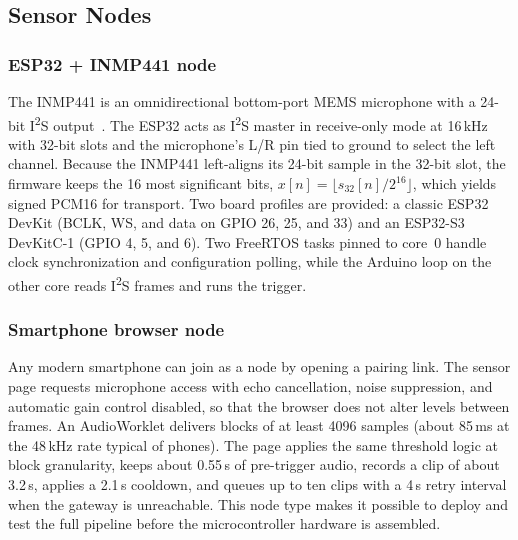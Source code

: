 \documentclass[conference]{IEEEtran}
\newcommand{\ms}{\,ms}
\begin{document}
\subsection{Sensor Nodes}
\subsubsection{ESP32 + INMP441 node}
The INMP441 is an omnidirectional bottom-port MEMS microphone with a 24-bit I\textsuperscript{2}S output~\cite{inmp441}. The ESP32 acts as I\textsuperscript{2}S master in receive-only mode at 16\,kHz with 32-bit slots and the microphone's L/R pin tied to ground to select the left channel. Because the INMP441 left-aligns its 24-bit sample in the 32-bit slot, the firmware keeps the 16 most significant bits, $x[n] = \lfloor s_{32}[n] / 2^{16} \rfloor$, which yields signed PCM16 for transport. Two board profiles are provided: a classic ESP32 DevKit (BCLK, WS, and data on GPIO 26, 25, and 33) and an ESP32-S3 DevKitC-1 (GPIO 4, 5, and 6). Two FreeRTOS tasks pinned to core~0 handle clock synchronization and configuration polling, while the Arduino loop on the other core reads I\textsuperscript{2}S frames and runs the trigger.

\subsubsection{Smartphone browser node}
Any modern smartphone can join as a node by opening a pairing link. The sensor page requests microphone access with echo cancellation, noise suppression, and automatic gain control disabled, so that the browser does not alter levels between frames. An AudioWorklet delivers blocks of at least 4096 samples (about 85\ms{} at the 48\,kHz rate typical of phones). The page applies the same threshold logic at block granularity, keeps about 0.55\,s of pre-trigger audio, records a clip of about 3.2\,s, applies a 2.1\,s cooldown, and queues up to ten clips with a 4\,s retry interval when the gateway is unreachable. This node type makes it possible to deploy and test the full pipeline before the microcontroller hardware is assembled.
\end{document}
